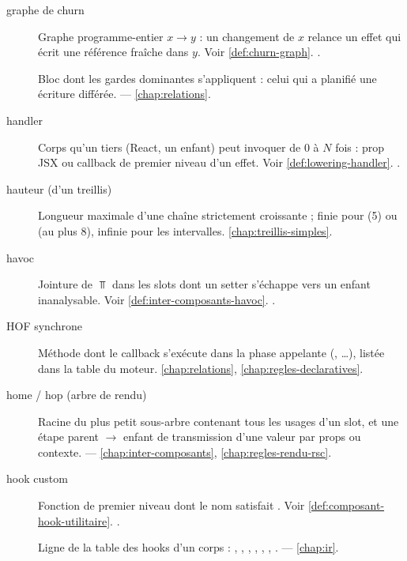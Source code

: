 \begin{description}
\item[graphe de churn] Graphe programme-entier \(x \to y\) : un changement de \(x\) relance un effet qui écrit une référence fraîche dans \(y\). Voir \cref{def:churn-graph}. .

\item[] Bloc dont les gardes dominantes s'appliquent : celui qui a planifié une écriture différée.  — \cref{chap:relations}.

\item[handler] Corps qu'un tiers (React, un enfant) peut invoquer de 0 à \(N\) fois : prop JSX  ou callback  de premier niveau d'un effet. Voir \cref{def:lowering-handler}. .

\item[hauteur (d'un treillis)] Longueur maximale d'une chaîne strictement croissante ; finie pour  (5) ou  (au plus 8), infinie pour les intervalles. \cref{chap:treillis-simples}.

\item[havoc] Jointure de \(\Top\) dans les slots dont un setter s'échappe vers un enfant inanalysable. Voir \cref{def:inter-composants-havoc}. .

\item[HOF synchrone] Méthode dont le callback s'exécute dans la phase appelante (, \ldots), listée dans la table  du moteur. \cref{chap:relations}, \cref{chap:regles-declaratives}.

\item[home / hop (arbre de rendu)] Racine du plus petit sous-arbre contenant tous les usages d'un slot, et une étape parent \(\to\) enfant de transmission d'une valeur par props ou contexte.  — \cref{chap:inter-composants}, \cref{chap:regles-rendu-rsc}.

\item[hook custom] Fonction de premier niveau dont le nom satisfait . Voir \cref{def:composant-hook-utilitaire}. .

\item[] Ligne de la table des hooks d'un corps : , , , , , , .  — \cref{chap:ir}.


\end{description}
